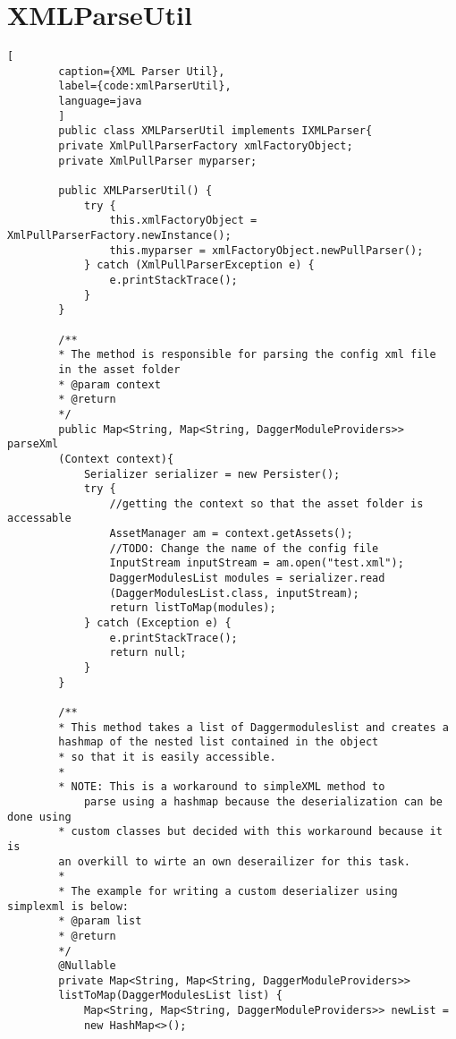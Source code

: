 \newpage
\section{XMLParseUtil}
    \begin{lstlisting}[
        caption={XML Parser Util},
        label={code:xmlParserUtil},
        language=java
        ]
        public class XMLParserUtil implements IXMLParser{
        private XmlPullParserFactory xmlFactoryObject;
        private XmlPullParser myparser;

        public XMLParserUtil() {
            try {
                this.xmlFactoryObject = XmlPullParserFactory.newInstance();
                this.myparser = xmlFactoryObject.newPullParser();
            } catch (XmlPullParserException e) {
                e.printStackTrace();
            }
        }

        /**
        * The method is responsible for parsing the config xml file 
        in the asset folder
        * @param context
        * @return
        */
        public Map<String, Map<String, DaggerModuleProviders>> parseXml
        (Context context){
            Serializer serializer = new Persister();
            try {
                //getting the context so that the asset folder is accessable
                AssetManager am = context.getAssets();
                //TODO: Change the name of the config file
                InputStream inputStream = am.open("test.xml");
                DaggerModulesList modules = serializer.read
                (DaggerModulesList.class, inputStream);
                return listToMap(modules);
            } catch (Exception e) {
                e.printStackTrace();
                return null;
            }
        }

        /**
        * This method takes a list of Daggermoduleslist and creates a 
        hashmap of the nested list contained in the object
        * so that it is easily accessible.
        *
        * NOTE: This is a workaround to simpleXML method to 
            parse using a hashmap because the deserialization can be done using
        * custom classes but decided with this workaround because it is 
        an overkill to wirte an own deserailizer for this task.
        *
        * The example for writing a custom deserializer using simplexml is below:
        * @param list
        * @return
        */
        @Nullable
        private Map<String, Map<String, DaggerModuleProviders>> 
        listToMap(DaggerModulesList list) {
            Map<String, Map<String, DaggerModuleProviders>> newList = 
            new HashMap<>();


\end{lstlisting}
